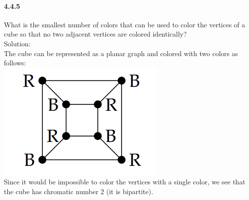 \documentclass{article}
\begin{document}
\paragraph{4.4.5}
What is the smallest number of colors that can be used to color
the vertices of a cube so that no two adjacent vertices are colored
identically?\\
Solution:\\
The cube can be represented as a planar graph and colored with two colors as follows:\\
\includegraphics{0114}\\
Since it would be impossible to color the vertices with a single color, we see that the cube has chromatic number 2 (it is bipartite).
\end{document}
